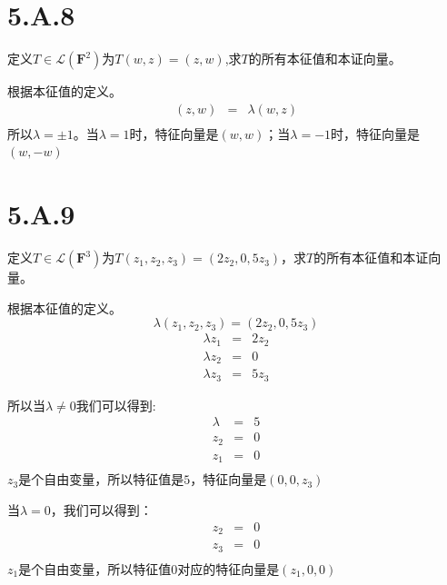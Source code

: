 \documentclass[10pt,a4paper,UTF8]{article}
\begin{document}
\section{5.A.8}
\label{sec:org1e02090}


\begin{problem}
定义\(T\in \mathcal{L}(\mathbf{F}^{2})\)为\(T(w,z) = (z,w)\),求\(T\)的所有本征值和本证向量。
\end{problem}

\begin{answer}
根据本征值的定义。
\begin{eqnarray}
\label{eq:3}
(z,w)&=&\lambda (w,z) \\
\end{eqnarray}
所以\(\lambda = \pm 1\)。当\(\lambda = 1\)时，特征向量是\((w,w)\)；当\(\lambda = -1\)时，特征向量是\((w,-w)\)
\end{answer}

\section{5.A.9}
\label{sec:org86d6610}


\begin{problem}
定义\(T\in \mathcal{L}(\mathbf{F}^{3})\)为\(T(z_{1},z_{2},z_{3}) = (2z_{2},0,5z_{3})\)，求\(T\)的所有本征值和本证向量。
\end{problem}

\begin{answer}
根据本征值的定义。\[\lambda (z_{1},z_{2},z_{3}) = (2z_{2},0,5z_{3}) \]
\begin{eqnarray}
\label{eq:4}
\lambda z_{1}&=& 2z_{2}\\
\lambda z_{2}&=& 0 \\
\lambda z_{3}&=& 5z_{3}
\end{eqnarray}

所以当\(\lambda \neq 0\)我们可以得到:
\begin{eqnarray}
\label{eq:5}
\lambda &=& 5 \\
z_{2} &=&0 \\
z_{1} &=&0 \\
\end{eqnarray}
\(z_{3}\)是个自由变量，所以特征值是\(5\)，特征向量是\((0,0,z_{3})\)

当\(\lambda =0\)，我们可以得到：
\begin{eqnarray}
\label{eq:6}
z_{2}&=&0 \\
z_{3}&=&0 \\
\end{eqnarray}
\(z_{1}\)是个自由变量，所以特征值\(0\)对应的特征向量是\((z_{1},0,0)\)
\end{answer}
\end{document}
